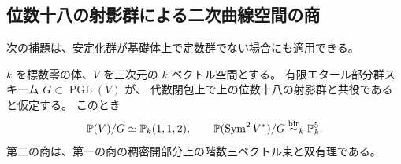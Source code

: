 \subsection{位数十八の射影群による二次曲線空間の商}

次の補題は、安定化群が基礎体上で定数群でない場合にも適用できる。

\begin{lemma}[安定化群の降下を含む有理性]
\label{lem:hesse-eighteen-conics-v28}
$k$ を標数零の体、$V$ を三次元の $k$ ベクトル空間とする。
有限エタール部分群スキーム $G\subset\operatorname{PGL}(V)$ が、
代数閉包上で上の位数十八の射影群と共役であると仮定する。
このとき
\[
 \mathbb P(V)/G\simeq\mathbb P_k(1,1,2),
 \qquad
 \mathbb P(\operatorname{Sym}^2V^*)/G\mathrel{\overset{\mathrm{bir}}{\sim}}_k\mathbb P_k^5.
\]
第二の商は、第一の商の稠密開部分上の階数三ベクトル束と双有理である。
\end{lemma}

